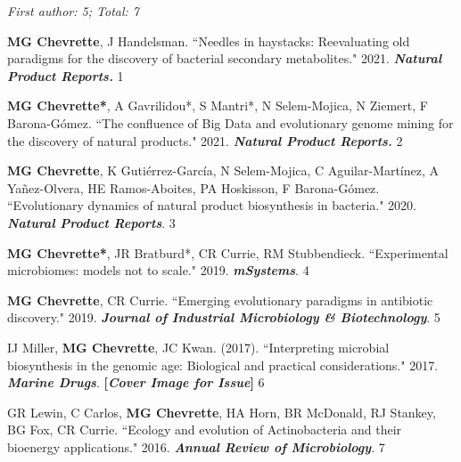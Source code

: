 
 \vspace{-2mm}

\begin{cvpubs}

\cvpub
{\hspace{-1cm} \textit{First author: 5; Total: 7}}
{}


\cvpub
{\textbf{MG Chevrette}, J Handelsman. ``Needles in haystacks: Reevaluating old paradigms for the discovery of bacterial secondary metabolites." 2021. \textit{\textbf{Natural Product Reports.}} \textbf{\textit{}}}
{1}

\cvpub
{\textbf{MG Chevrette*}, A Gavrilidou*, S Mantri*, N Selem-Mojica, N Ziemert, F Barona-G\'{o}mez. ``The confluence of Big Data and evolutionary genome mining for the discovery of natural products." 2021. \textit{\textbf{Natural Product Reports.}} \textbf{\textit{}}}
{2}

\cvpub
{\textbf{MG Chevrette}, K Guti\'{e}rrez-Garc\'{i}a, N Selem-Mojica, C Aguilar-Mart\'{i}nez, A Ya\~{n}ez-Olvera, HE Ramos-Aboites, PA Hoskisson, F Barona-G\'{o}mez. ``Evolutionary dynamics of natural product biosynthesis in bacteria." 2020. \textit{\textbf{Natural Product Reports}}. \textbf{\textit{}}}
{3}

\cvpub
{\textbf{MG Chevrette*}, JR Bratburd*, CR Currie, RM Stubbendieck. ``Experimental microbiomes: models not to scale." 2019. \textit{\textbf{mSystems}}. \textbf{\textit{}}}
{4}

\cvpub
{\textbf{MG Chevrette}, CR Currie. ``Emerging evolutionary paradigms in antibiotic discovery." 2019. \textit{\textbf{Journal of Industrial Microbiology \& Biotechnology}}. \textbf{\textit{}}}
{5}

\cvpub
{IJ Miller, \textbf{MG Chevrette}, JC Kwan. (2017). ``Interpreting microbial biosynthesis in the genomic age: Biological and practical considerations." 2017. \textit{\textbf{Marine Drugs}}. \textbf{\textit{}} \linebreak \textbf{[\textit{Cover Image for Issue}]}}
{6}

\cvpub
{GR Lewin, C Carlos, \textbf{MG Chevrette}, HA Horn, BR McDonald, RJ Stankey, BG Fox, CR Currie. ``Ecology and evolution of Actinobacteria and their bioenergy applications." 2016. \textit{\textbf{Annual Review of Microbiology}}. \textbf{\textit{}}}
{7}

\end{cvpubs}

